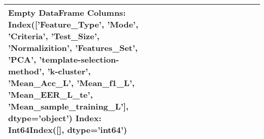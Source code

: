 \begin{tabular}{llllrllrlrrrrr}
\toprule
Empty DataFrame
Columns: Index(['Feature\_Type', 'Mode', 'Criteria', 'Test\_Size', 'Normalizition',
       'Features\_Set', 'PCA', 'template-selection-method', 'k-cluster',
       'Mean\_Acc\_L', 'Mean\_f1\_L', 'Mean\_EER\_L\_te', 'Mean\_sample\_training\_L'],
      dtype='object')
Index: Int64Index([], dtype='int64') \\
\bottomrule
\end{tabular}
